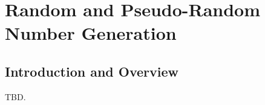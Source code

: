 \chapter{Random and Pseudo-Random Number Generation}
\label{crng0}

\section{Introduction and Overview}
\label{crng0:siov0}

TBD.

